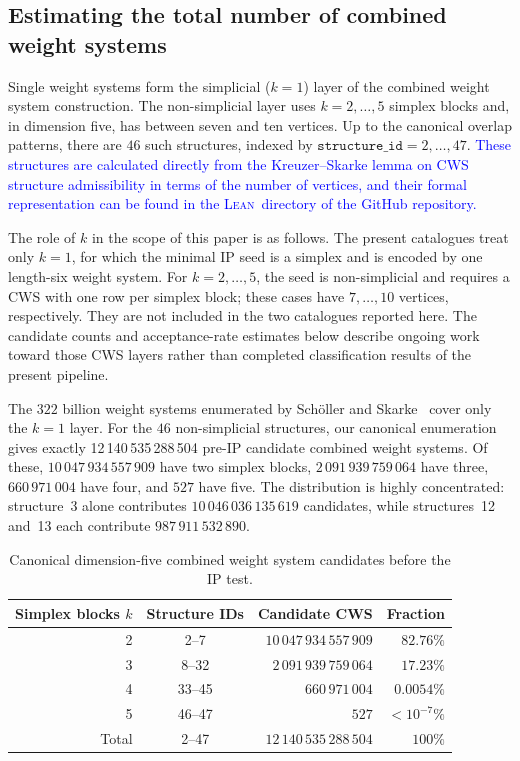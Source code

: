 \documentclass[appliedmath,article,submit,moreauthors]{Definitions/mdpi}
\newcommand{\Lean}{\textsc{Lean}}
\begin{document}
\subsection{Estimating the total number of combined weight systems}
\label{sec:discussion-cws-estimate}

Single weight systems form the simplicial ($k=1$) layer of the
combined weight system construction. The non-simplicial layer uses
$k=2,\ldots,5$ simplex blocks and, in dimension five, has between seven and ten
vertices. Up to the canonical overlap patterns, there are $46$ such structures,
indexed by
 \(\texttt{structure\_id}=2,\ldots,47\). \textcolor{blue}{These structures are
 calculated directly from the Kreuzer--Skarke lemma on CWS structure
 admissibility in terms of the number of vertices, and their formal
 representation can be found in the \Lean\ directory of the GitHub repository.}

{\color{blue}
The role of \(k\) in the scope of this paper is as follows. The present
catalogues treat only \(k=1\), for which the minimal IP seed is a simplex and is
encoded by one length-six weight system. For \(k=2,\ldots,5\), the seed is
non-simplicial and requires a CWS with one row per simplex block; these cases
have \(7,\ldots,10\) vertices, respectively. They are not included in the two
catalogues reported here. The candidate counts and acceptance-rate estimates
below describe ongoing work toward those CWS layers rather than completed
classification results of the present pipeline.
}
 
 The $322$ billion weight systems enumerated by Sch\"oller and
 Skarke~\cite{Scholler2019} cover only the $k=1$ layer. For the $46$
 non-simplicial structures, our canonical enumeration gives exactly
 12\,140\,535\,288\,504 pre-IP candidate combined weight systems. Of these,
 $10\,047\,934\,557\,909$ have two simplex blocks, $2\,091\,939\,759\,064$ have
 three, $660\,971\,004$ have four, and $527$ have five. The distribution is
 highly concentrated: structure~3 alone contributes $10\,046\,036\,135\,619$
 candidates, while structures~12 and~13 each contribute $987\,911\,532\,890$.
 
 \begin{table}[ht]
 \centering
 \begin{tabular}{rcrr}
 \hline
 Simplex blocks $k$ & Structure IDs & Candidate CWS & Fraction \\
 \hline
 2 & 2--7   & $10\,047\,934\,557\,909$ & $82.76\%$ \\
 3 & 8--32  & $ 2\,091\,939\,759\,064$ & $17.23\%$ \\
 4 & 33--45 & $       660\,971\,004$ & $0.0054\%$ \\
 5 & 46--47 & $                 527$ & $<10^{-7}\%$ \\
 \hline
 Total & 2--47 & $12\,140\,535\,288\,504$ & $100\%$ \\
 \hline
 \end{tabular}
 \caption{Canonical dimension-five combined weight system candidates before the IP test.}
 \end{table}
\end{document}
